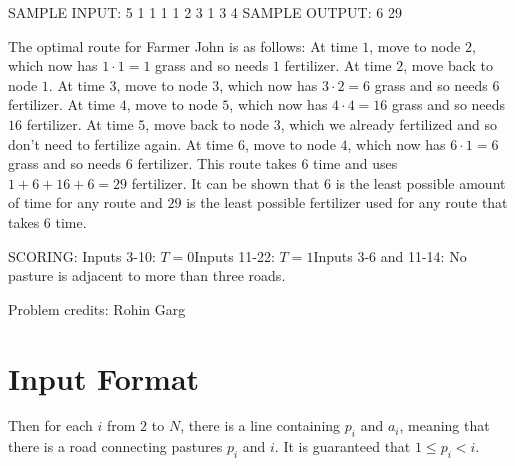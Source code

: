 \documentclass[12pt]{article}
\begin{document}
SAMPLE INPUT:
5 1
1 1
1 2
3 1
3 4
SAMPLE OUTPUT: 
6 29

The optimal route for Farmer John is as follows:
 At time $1$, move to node $2$, which now has $1 \cdot 1 = 1$ grass and so
needs $1$ fertilizer. At time $2$, move back to node $1$.
At time $3$, move to node $3$, which now has $3 \cdot 2 = 6$ grass and so needs
$6$ fertilizer. At time $4$, move to node $5$, which now has
$4 \cdot 4 = 16$ grass and so needs $16$ fertilizer. At time $5$,
move back to node $3$, which we already fertilized and so don't need to
fertilize again.  At time $6$, move to node $4$, which now has
$6 \cdot 1 = 6$ grass and so needs $6$ fertilizer.
This route takes $6$ time and uses $1 + 6 + 16 + 6 = 29$ fertilizer. It can be
shown that $6$ is the least possible amount of time for any route and $29$ is
the least possible fertilizer used for any route that takes $6$ time. 

SCORING:
Inputs 3-10: $T=0$Inputs 11-22: $T=1$Inputs 3-6 and 11-14: No pasture is adjacent to more than three roads.


Problem credits: Rohin Garg



\section*{Input Format}
Then for each $i$ from $2$ to $N$, there is a line containing $p_i$ and $a_i$,
meaning that there is a road connecting pastures $p_i$ and $i$. It is guaranteed
that $1\le p_i<i$.
\end{document}

